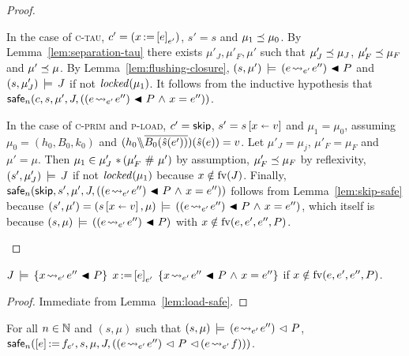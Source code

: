 \documentclass[11pt]{report}
\begin{document}
\begin{proof}
\begin{enumerate}
		In the case of \textsc{c-tau}, $c' = (x \operatorname{:\!=} \left[ e \right]_{e'})$, $s' = s$ and $\mu_1 \preceq \mu_0$. By Lemma~\ref{lem:separation-tau} there exists $\mu'_J,\mu'_F,\mu'$ such that $\mu'_J \preceq \mu_J$, $\mu'_F \preceq \mu_F$ and $\mu' \preceq \mu$. By Lemma~\ref{lem:flushing-closure}, $(s,\mu') \,\models\, (e \!\leadsto_{e'}\! e'') \operatorname{\,\blacktriangleleft\,} P$ and $(s,\mu'_J) \,\models\, J$ if not $\mathit{locked}(\mu_1)$. It follows from the inductive hypothesis that $\mathsf{safe}_{n}(c,s,\mu',J,((e \!\leadsto_{e'}\! e'') \operatorname{\,\blacktriangleleft\,} P \operatorname{\,\wedge\,} x = e''))$. 

		In the case of \textsc{c-prim} and \textsc{p-load}, $c' = \operatorname{\mathsf{skip}}$, $s' = s \left[ x \shortleftarrow v \right]$ and $\mu_1 = \mu_0$, assuming $\mu_0 = (h_0,B_0,k_0)$ and $(h_0 \backslash\!\!\backslash \overline{B_0(\hat{s}(e'))})(\hat{s}(e)) = v$. Let $\mu'_J = \mu_j$, $\mu'_F = \mu_F$ and $\mu' = \mu$. Then $\mu_1 \in \mu'_J \operatorname{\,\ast\,} (\mu'_F \operatorname{\,\#\,} \mu')$ by assumption, $\mu'_F \preceq \mu_F$ by reflexivity, $(s',\mu'_J) \,\models\, J$ if not $\mathit{locked}(\mu_1)$ because $x \notin \mathrm{fv}(J)$. Finally, $\mathsf{safe}_{n}(\operatorname{\mathsf{skip}},s',\mu',J,((e \!\leadsto_{e'}\! e'') \operatorname{\,\blacktriangleleft\,} P \operatorname{\,\wedge\,} x = e''))$ follows from Lemma~\ref{lem:skip-safe} because $(s',\mu') = (s \left[ x \shortleftarrow v \right],\mu) \,\models\, ((e \!\leadsto_{e'}\! e'') \operatorname{\,\blacktriangleleft\,} P \operatorname{\,\wedge\,} x = e'')$, which itself is because $(s,\mu) \,\models\, ((e \!\leadsto_{e'}\! e'') \operatorname{\,\blacktriangleleft\,} P)$ with $x \notin \mathrm{fv}(e,e',e'',P)$. 
	\end{enumerate}
\end{proof}

\begin{lemma}
    \label{lem:load-sound}
    $J\,\models\,\left\lbrace x \!\leadsto_{e'}\! e'' \operatorname{\,\blacktriangleleft\,} P \right\rbrace\;x \operatorname{:\!=} \left[ e \right]_{e'}\;\left\lbrace x \!\leadsto_{e'}\! e'' \operatorname{\,\blacktriangleleft\,} P \operatorname{\,\wedge\,} x = e'' \right\rbrace$ if $x \notin \mathrm{fv}(e,e',e'',P)$. 
\end{lemma} 

\begin{proof}
    Immediate from Lemma~\ref{lem:load-safe}. 
\end{proof}

\begin{lemma}
    \label{lem:store-safe}
    For all $n \in \mathbb{N}$ and $(s,\mu)$ such that $(s,\mu) \,\models\, (e \!\leadsto_{e'}\! e'') \operatorname{\,\vartriangleleft\,} P$, $\mathsf{safe}_{n}(\left[ e \right] \operatorname{:\!=} f_{e'},s,\mu,J,\left((e \!\leadsto_{e'}\! e'') \operatorname{\,\vartriangleleft\,} P \operatorname{\,\vartriangleleft\,} (e \!\leadsto_{e'}\! f)\right))$. 
\end{lemma}
\end{document}
